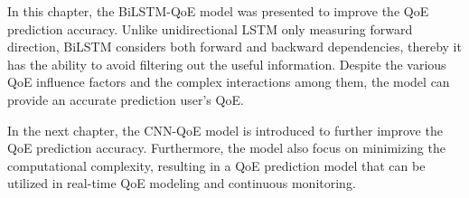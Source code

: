 In this chapter, the BiLSTM-QoE model was presented to improve the QoE prediction accuracy.
Unlike unidirectional LSTM only measuring forward direction, BiLSTM considers both forward and backward dependencies, thereby it has the ability to avoid filtering out the useful information.
Despite the various QoE influence factors and the complex interactions among them, the model can provide an accurate prediction user’s QoE.


In the next chapter, the CNN-QoE model is introduced to further improve the QoE prediction accuracy.
Furthermore, the model also focus on minimizing the computational complexity, resulting in a QoE prediction model that can be utilized in real-time QoE modeling and continuous monitoring.
